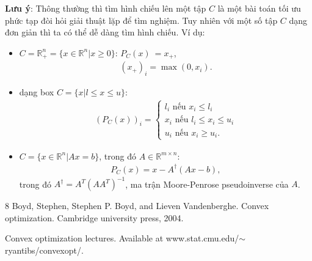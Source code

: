 \documentclass{book}
\begin{document}
\textbf{Lưu ý}: Thông thường thì tìm hình chiếu lên một tập $C$ là một bài toán tối ưu phức tạp đòi hỏi giải thuật lặp để tìm nghiệm. Tuy nhiên với một số tập $C$ dạng đơn giản thì ta có thể dễ dàng tìm hình chiếu. Ví dụ:
\begin{itemize}
\item $C = \mathbb{R}^n_+ = \{x \in \mathbb{R}^n | x \geq 0 \}$: $P_{C}(x)\ = x_+$, 
\begin{align*}
(x_+)_i = \max(0, x_i). 
\end{align*}

\item dạng box $C = \{ x | l \leq x \leq u \}$:
\begin{align*}
(P_C(x))_i = \begin{cases} l_i \textrm{ nếu } x_i \leq l_i \\ 
							x_i \textrm{ nếu } l_i \leq x_i \leq u_i \\
							u_i \textrm{ nếu } x_i \geq u_i. \end{cases} 
\end{align*}

\item $C = \{ x \in \mathbb{R}^n | Ax = b\}$, trong đó $A \in \mathbb{R}^{m \times n}$:
\begin{align*}
P_C (x) = x - A^{\dagger}(Ax - b),
\end{align*}
trong đó $A^{\dagger} = A^T(AA^T)^{-1}$, ma trận Moore-Penrose pseudoinverse của $A$.
\end{itemize}





\begin{thebibliography}{8}
Boyd, Stephen, Stephen P. Boyd, and Lieven Vandenberghe. Convex optimization. Cambridge university press, 2004.

Convex optimization lectures. Available at www.stat.cmu.edu/$\sim$ryantibs/convexopt/.
\end{thebibliography}
\end{document}
